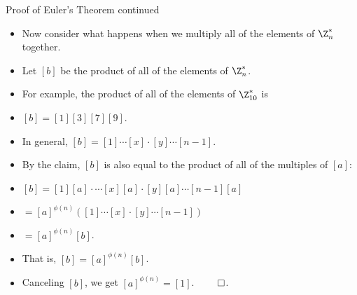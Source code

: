 \documentclass[handout]{beamer}
\begin{document}
\begin{frame}{Proof of Euler's Theorem continued}

\begin{itemize}
  \item Now consider what happens when we multiply all of the elements of $\Z^*_n$ together.
  \item Let $[b]$ be the product of all of the elements of $\Z^*_n$.
  \item For example, the product of all of the elements of $\Z^*_{10}$ is
  \item $[b] = [1][3][7][9]$.
  \item In general, $[b]=[1]\cdots[x]\cdot[y] \cdots [n-1]$.
  \item By the claim, $[b]$ is also equal to the product of all of the multiples of $[a]$:
  \item $[b]=[1][a]\cdot \cdots[x][a]\cdot[y][a] \cdots [n-1][a]$
  \item  $=[a]^{\phi(n)}([1]\cdots[x]\cdot[y] \cdots [n-1])$
  \item $=[a]^{\phi(n)}[b]$.
  \item That is, $[b] = [a]^{\phi(n)} [b]$.
  \item Canceling $[b]$, we get $[a]^{\phi(n)}=[1]$. $\qed$.
\end{itemize}

\end{frame}
\end{document}
